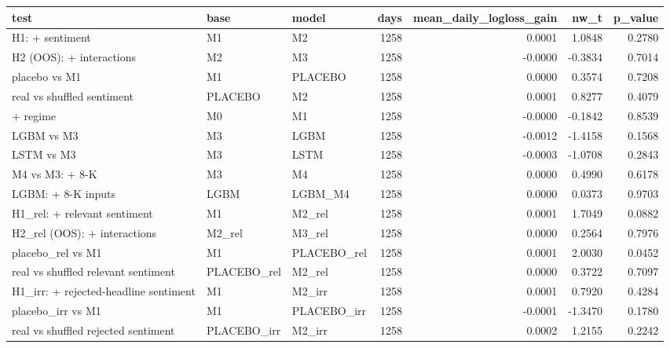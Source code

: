 \begin{tabular}{lllrrrr}
\toprule
test & base & model & days & mean\_daily\_logloss\_gain & nw\_t & p\_value \\
\midrule
H1: + sentiment & M1 & M2 & 1258 & 0.0001 & 1.0848 & 0.2780 \\
H2 (OOS): + interactions & M2 & M3 & 1258 & -0.0000 & -0.3834 & 0.7014 \\
placebo vs M1 & M1 & PLACEBO & 1258 & 0.0000 & 0.3574 & 0.7208 \\
real vs shuffled sentiment & PLACEBO & M2 & 1258 & 0.0001 & 0.8277 & 0.4079 \\
+ regime & M0 & M1 & 1258 & -0.0000 & -0.1842 & 0.8539 \\
LGBM vs M3 & M3 & LGBM & 1258 & -0.0012 & -1.4158 & 0.1568 \\
LSTM vs M3 & M3 & LSTM & 1258 & -0.0003 & -1.0708 & 0.2843 \\
M4 vs M3: + 8-K & M3 & M4 & 1258 & 0.0000 & 0.4990 & 0.6178 \\
LGBM: + 8-K inputs & LGBM & LGBM\_M4 & 1258 & 0.0000 & 0.0373 & 0.9703 \\
H1\_rel: + relevant sentiment & M1 & M2\_rel & 1258 & 0.0001 & 1.7049 & 0.0882 \\
H2\_rel (OOS): + interactions & M2\_rel & M3\_rel & 1258 & 0.0000 & 0.2564 & 0.7976 \\
placebo\_rel vs M1 & M1 & PLACEBO\_rel & 1258 & 0.0001 & 2.0030 & 0.0452 \\
real vs shuffled relevant sentiment & PLACEBO\_rel & M2\_rel & 1258 & 0.0000 & 0.3722 & 0.7097 \\
H1\_irr: + rejected-headline sentiment & M1 & M2\_irr & 1258 & 0.0001 & 0.7920 & 0.4284 \\
placebo\_irr vs M1 & M1 & PLACEBO\_irr & 1258 & -0.0001 & -1.3470 & 0.1780 \\
real vs shuffled rejected sentiment & PLACEBO\_irr & M2\_irr & 1258 & 0.0002 & 1.2155 & 0.2242 \\
\bottomrule
\end{tabular}
